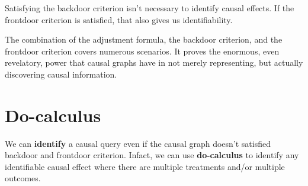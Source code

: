 Satisfying the backdoor criterion isn't necessary to identify causal effects. If the 
frontdoor criterion is satisfied, that also gives us identifiability.

The combination of the adjustment formula, the backdoor criterion, and the frontdoor 
criterion covers numerous scenarios. It proves the enormous, even revelatory, power 
that causal graphs have in not merely representing, but actually discovering causal
information.
\section{Do-calculus}

We can \textbf{identify} a causal query even if the causal graph doesn't satisfied backdoor and frontdoor criterion.
Infact, we can use \textbf{do-calculus} to identify any identifiable causal effect where there are multiple 
treatments and/or multiple outcomes.


